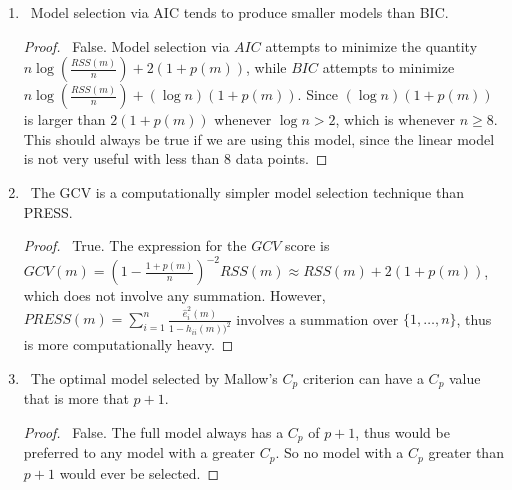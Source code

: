 \documentclass[12pt]{article}
\begin{document}
\begin{enumerate}[leftmargin=0cm,itemindent=.5cm,labelwidth=\itemindent,labelsep=0cm,align=left]
\begin{enumerate}
\item \ Model selection via AIC tends to produce smaller models than BIC.

\begin{proof}
\ False.  Model selection via $AIC$ attempts to minimize the quantity $n \log \left( \frac{RSS(m)}{n} \right) + 2(1+p(m))$, while $BIC$ attempts to minimize $n \log \left( \frac{RSS(m)}{n} \right) + (\log n)(1+p(m))$.  Since $(\log n)(1+p(m))$ is larger than $2(1+p(m))$ whenever $\log n > 2$, which is whenever $n \geq 8$.  This should always be true if we are using this model, since the linear model is not very useful with less than $8$ data points.
\end{proof}

\item \ The GCV is a computationally simpler model selection technique than PRESS.

\begin{proof}
\ True.  The expression for the $GCV$ score is $GCV(m) = \left( 1 - \frac{1+p(m)}{n} \right)^{-2} RSS(m) \approx RSS(m) + 2(1 + p(m))$, which does not involve any summation.  However, $PRESS(m) = \sum_{i=1}^n \frac{\hat{e}_i^2(m)}{1-h_{ii}(m))^2}$ involves a summation over $\{1, \dots , n \}$, thus is more computationally heavy.
\end{proof}

\item \ The optimal model selected by Mallow's $C_p$ criterion can have a $C_p$ value that is more that $p+1$.

\begin{proof}
\ False.  The full model always has a $C_p$ of $p+1$, thus would be preferred to any model with a greater $C_p$.  So no model with a $C_p$ greater than $p+1$ would ever be selected.
\end{proof}
\end{enumerate}

\end{enumerate}
\end{document}
